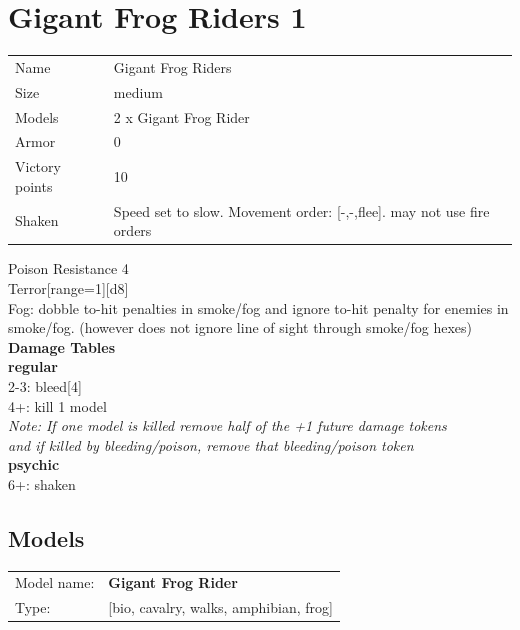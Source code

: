  















\clearpage

\section{ Gigant Frog Riders 1 }

\begin{tabular}{ll}
  Name & Gigant Frog Riders \\
  Size & medium\\
  Models & 2 x Gigant Frog Rider\\
  Armor & 0\\
  Victory points & 10\\
  Shaken & Speed set to slow. Movement order: [-,-,flee]. may not use fire orders\\
\end{tabular}

Poison Resistance 4\\ 
Terror[range=1][d8]\\ 
Fog: dobble to-hit penalties in smoke/fog and ignore to-hit penalty for enemies in smoke/fog. (however does not ignore line of sight through smoke/fog hexes)\\ 



{\bf Damage Tables} \\
 {\bf regular } \\
2-3: bleed[4] \\
4+: kill 1 model \\
{{\it Note: If one model is killed remove half of the +1 future damage tokens \\ and if killed by bleeding/poison, remove that bleeding/poison token}} \\
 {\bf psychic } \\
6+: shaken \\


\clearpage

\subsection{ Models }

\begin{tabular}{ll}
Model name: & {\bf Gigant Frog Rider } \\
Type: & [bio, cavalry, walks, amphibian, frog] \\
\end{tabular}

